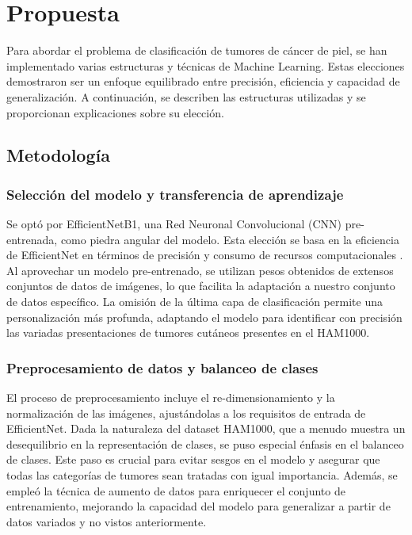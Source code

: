 \chapter{Propuesta}\label{chapter:proposal}

Para abordar el problema de clasificación de tumores de cáncer de piel, se han implementado varias estructuras y técnicas de Machine Learning. Estas elecciones demostraron ser un enfoque equilibrado entre precisión, eficiencia y capacidad de generalización. A continuación, se describen las estructuras utilizadas y se proporcionan explicaciones sobre su elección.

\section{Metodología}\label{sec:method}

\subsection{Selección del modelo y transferencia de aprendizaje}

Se optó por EfficientNetB1, una Red Neuronal Convolucional (CNN) pre-entrenada, como piedra angular del modelo. Esta elección se basa en la eficiencia de EfficientNet en términos de precisión y consumo de recursos computacionales . Al aprovechar un modelo pre-entrenado, se utilizan pesos obtenidos de extensos conjuntos de datos de imágenes, lo que facilita la adaptación a nuestro conjunto de datos específico. La omisión de la última capa de clasificación permite una personalización más profunda, adaptando el modelo para identificar con precisión las variadas presentaciones de tumores cutáneos presentes en el HAM1000.

\subsection{Preprocesamiento de datos y balanceo de clases}

El proceso de preprocesamiento incluye el re-dimensionamiento y la normalización de las imágenes, ajustándolas a los requisitos de entrada de EfficientNet. Dada la naturaleza del dataset HAM1000, que a menudo muestra un desequilibrio en la representación de clases, se puso especial énfasis en el balanceo de clases. Este paso es crucial para evitar sesgos en el modelo y asegurar que todas las categorías de tumores sean tratadas con igual importancia. Además, se empleó la técnica de aumento de datos para enriquecer el conjunto de entrenamiento, mejorando la capacidad del modelo para generalizar a partir de datos variados y no vistos anteriormente.

